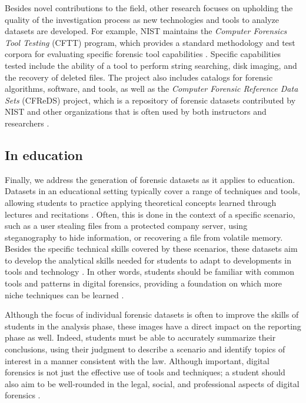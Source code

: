 \documentclass[letterpaper,12pt]{report}
\begin{document}
Besides novel contributions to the field, other research focuses on
upholding the quality of the investigation process as new technologies
and tools to analyze datasets are developed. For example, NIST maintains
the \emph{Computer Forensics Tool Testing} (CFTT) program, which
provides a standard methodology and test corpora for evaluating specific
forensic tool capabilities
\cite{nationalinstituteofstandardsandtechnologyComputerForensicsTool2017}.
Specific capabilities tested include the ability of a tool to perform
string searching, disk imaging, and the recovery of deleted files. The
project also includes catalogs for forensic algorithms, software, and
tools, as well as the \emph{Computer Forensic Reference Data Sets}
(CFReDS) project, which is a repository of forensic datasets contributed
by NIST and other organizations that is often used by both instructors
and researchers
\cite{nationalinstituteofstandardsandtechnologyCFReDSPortal}.

\subsection{In education}\label{in-education}

Finally, we address the generation of forensic datasets as it applies to
education. Datasets in an educational setting typically cover a range of
techniques and tools, allowing students to practice applying theoretical
concepts learned through lectures and recitations
\cite{adelsteinAutomaticallyCreatingRealistic2005}. Often, this is
done in the context of a specific scenario, such as a user stealing
files from a protected company server, using steganography to hide
information, or recovering a file from volatile memory. Besides the
specific technical skills covered by these scenarios, these datasets aim
to develop the analytical skills needed for students to adapt to
developments in tools and technology
\cite{cooperStandardsDigitalForensics2010}. In other words, students
should be familiar with common tools and patterns in digital forensics,
providing a foundation on which more niche techniques can be learned
\cite{lawrenceFrameworkDesignWebbased2009}.

Although the focus of individual forensic datasets is often to improve
the skills of students in the analysis phase, these images have a direct
impact on the reporting phase as well. Indeed, students must be able to
accurately summarize their conclusions, using their judgment to describe
a scenario and identify topics of interest in a manner consistent with
the law. Although important, digital forensics is not just the effective
use of tools and techniques; a student should also aim to be
well-rounded in the legal, social, and professional aspects of digital
forensics \cite{andersonComparativeStudyTeaching2006}.
\end{document}
